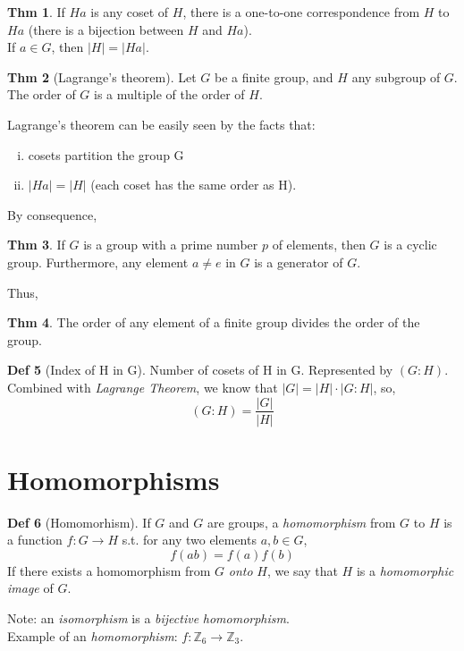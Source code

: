 \documentclass{article}
\theoremstyle{definition}
\newtheorem{definition}{Def}[section]
\newtheorem{theorem}[definition]{Thm}
\begin{document}
\begin{theorem}
    If $Ha$ is any coset of $H$, there is a one-to-one correspondence from $H$ to $Ha$ (there is a bijection between $H$ and $Ha$).\\
    If $a \in G$, then $|H| = |Ha|$.
\end{theorem}

\begin{theorem}[Lagrange's theorem]
    Let $G$ be a finite group, and $H$ any subgroup of $G$. The order of $G$ is a multiple of the order of $H$.
\end{theorem}
    Lagrange's theorem can be easily seen by the facts that:
    \begin{enumerate}[i.]
	\item cosets partition the group G
	\item $|Ha| = |H|$ (each coset has the same order as H). 
    \end{enumerate}


By consequence,
\begin{theorem}
    If $G$ is a group with a prime number $p$ of elements, then $G$ is a cyclic group. Furthermore, any element $a \neq e$ in $G$ is a generator of $G$.
\end{theorem}

Thus,
\begin{theorem}
    The order of any element of a finite group divides the order of the group.
\end{theorem}

\begin{definition}[Index of H in G]
    Number of cosets of H in G. Represented by $(G:H)$.\\
    Combined with \emph{Lagrange Theorem}, we know that $|G| = |H| \cdot |G:H|$, so,
    $$(G:H) = \frac{|G|}{|H|}$$
\end{definition}


\section{Homomorphisms}

\begin{definition}[Homomorhism]
    If $G$ and $G$ are groups, a \emph{homomorphism} from $G$ to $H$ is a function $f: G \rightarrow H$ s.t. for any two elements $a, b \in G$,
    $$f(ab) = f(a)f(b)$$
    If there exists a homomorphism from $G$ \emph{onto} $H$, we say that $H$ is a \emph{homomorphic image} of $G$.
\end{definition}
Note: an \emph{isomorphism} is a \emph{bijective} \emph{homomorphism}.
\\
Example of an \emph{homomorphism}: $f: \mathbb{Z}_6 \rightarrow \mathbb{Z}_3$.
\end{document}
